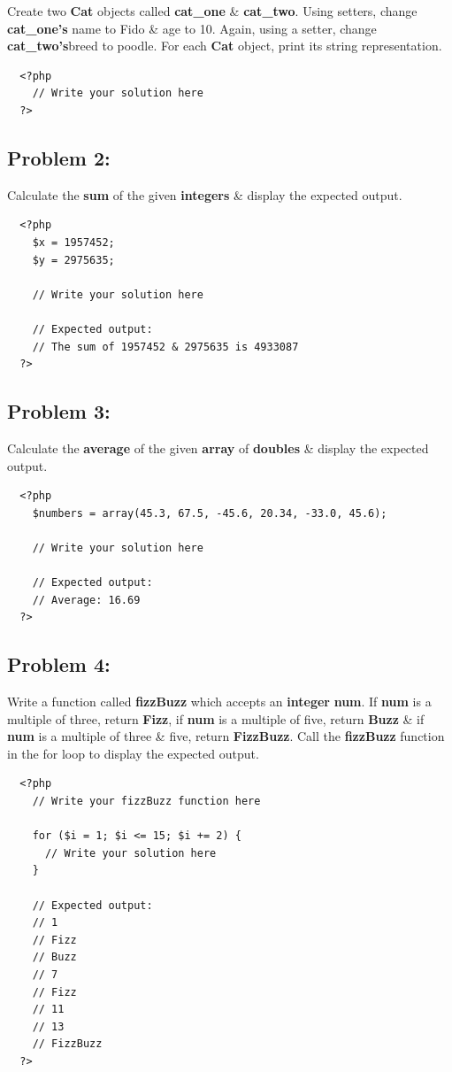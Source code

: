 \documentclass{article}
\begin{document}
Create two \textbf{Cat} objects called \textbf{cat\_one} \& \textbf{cat\_two}. Using setters, change \textbf{cat\_one's} name to Fido & age to 10. Again, using a setter, change \textbf{cat\_two's}breed to poodle. For each \textbf{Cat} object, print its string representation.

\begin{verbatim}
  <?php
    // Write your solution here
  ?>
\end{verbatim}

\subsection*{Problem 2:} 
Calculate the \textbf{sum} of the given \textbf{integers} \& display the expected output.

\begin{verbatim}
  <?php
    $x = 1957452;
    $y = 2975635;

    // Write your solution here

    // Expected output:
    // The sum of 1957452 & 2975635 is 4933087
  ?>
\end{verbatim}

\subsection*{Problem 3:} 
Calculate the \textbf{average} of the given \textbf{array} of \textbf{doubles} \& display the expected output.

\begin{verbatim}
  <?php
    $numbers = array(45.3, 67.5, -45.6, 20.34, -33.0, 45.6);

    // Write your solution here

    // Expected output:
    // Average: 16.69 
  ?>
\end{verbatim}

\subsection*{Problem 4:}
Write a function called \textbf{fizzBuzz} which accepts an \textbf{integer} \textbf{num}. If \textbf{num} is a multiple of three, return \textbf{Fizz}, if \textbf{num} is a multiple of five, return \textbf{Buzz} \& if \textbf{num} is a multiple of three \& five, return \textbf{FizzBuzz}. Call the \textbf{fizzBuzz} function in the for loop to display the expected output.

\begin{verbatim}
  <?php
    // Write your fizzBuzz function here
    
    for ($i = 1; $i <= 15; $i += 2) {
      // Write your solution here
    }

    // Expected output:
    // 1
    // Fizz 
    // Buzz
    // 7
    // Fizz
    // 11
    // 13
    // FizzBuzz
  ?>
\end{verbatim}
\end{document}
